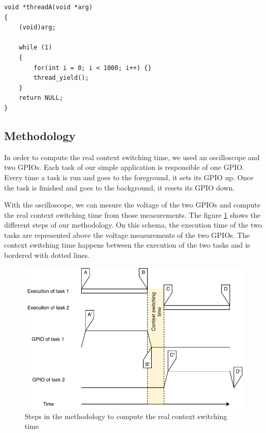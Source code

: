 \begin{lstlisting}[style=CStyle, float, label={lst:simple-task-code-riot}, caption={Source code of a task implemented in RIOT for the simple application}]
void *threadA(void *arg)
{
    (void)arg;

    while (1)
    {
        for(int i = 0; i < 1000; i++) {}
        thread_yield();
    }
    return NULL;
}
\end{lstlisting}


\subsection{Methodology}

In order to compute the real context switching time, we used an oscilloscope and two GPIOs.
Each task of our simple application is responsible of one GPIO.
Every time a task is run and goes to the foreground, it sets its GPIO up.
Once the task is finished and goes to the background, it resets its GPIO down.

With the oscilloscope, we can mesure the voltage of the two GPIOs and compute the real context switching time from those measurements.
The figure \ref{fig:real-context-switching-time-measurement} shows the different steps of our methodology.
On this schema, the execution time of the two tasks are represented above the voltage measurements of the two GPIOs.
The context switching time happens between the execution of the two tasks and is bordered with dotted lines.

\begin{figure}[!ht]
  \centering
  \includegraphics[scale=1]{assets/real-context-switching-time-measurement.pdf}
  \caption{\label{fig:real-context-switching-time-measurement}Steps in the methodology to compute the real context switching time}
\end{figure}

